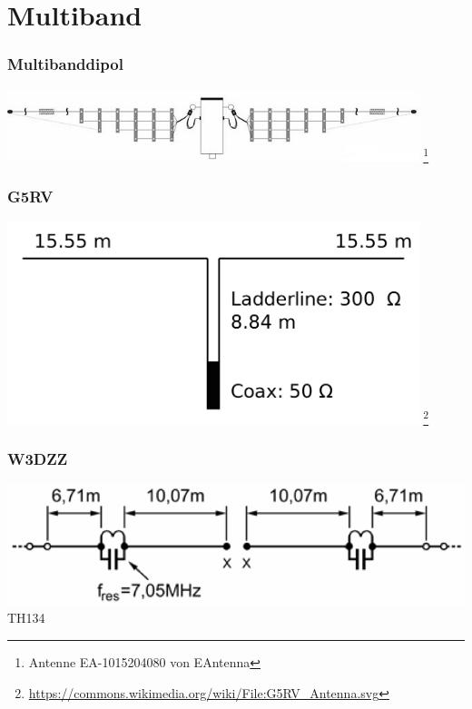 \section*{Multiband}

\begin{frame}
    \frametitle{Multibanddipol}
    \begin{center}
        \includegraphics[width=0.9\textwidth]{a09/Multiband.jpg}
        \footnote{\tiny Antenne EA-1015204080 von EAntenna}
	\end{center}
\end{frame}

\begin{frame}
    \frametitle{G5RV}
    \begin{center}
        \includegraphics[width=0.9\textwidth]{a09/G5RV_Antenna.png}
        \footnote{\tiny \url{https://commons.wikimedia.org/wiki/File:G5RV_Antenna.svg}}
	\end{center}
\end{frame}

\begin{frame}
    \frametitle{W3DZZ}
    \begin{center}
        \includegraphics[width=1\textwidth]{a09/W3DZZ.png}
        \tiny \hyperlink{refs}{\cite{bna}} TH134
	\end{center}
\end{frame}

